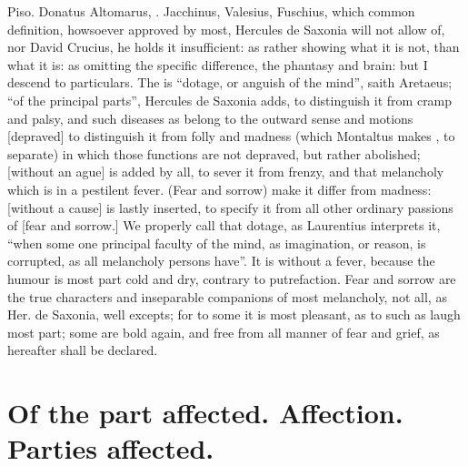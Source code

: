  Piso. 
Donatus Altomarus, . Jacchinus,
Valesius,  Fuschius,
 \etc{} which common
definition, howsoever approved by most, Hercules de
Saxonia will not allow of, nor David Crucius,  he holds it insufficient: as
rather showing what it is not, than what it is: as
omitting the specific difference, the phantasy and brain: but I descend to
particulars. The  is \enquote{dotage, or anguish of the mind}, saith
Aretaeus; \enquote{of the principal parts}, Hercules de Saxonia adds, to distinguish it
from cramp and palsy, and such diseases as belong to the outward sense and
motions [depraved] to distinguish it from folly and
madness (which Montaltus makes , to separate) in which those
functions are not depraved, but rather abolished; [without an ague] is added by
all, to sever it from frenzy, and that melancholy which is in a pestilent
fever. (Fear and sorrow) make it differ from madness: [without a cause] is
lastly inserted, to specify it from all other ordinary passions of [fear and
sorrow.] We properly call that dotage, as Laurentius
interprets it, \enquote{when some one principal faculty of the mind, as imagination, or
reason, is corrupted, as all melancholy persons have}. It is without a fever,
because the humour is most part cold and dry, contrary to putrefaction. Fear
and sorrow are the true characters and inseparable companions of most
melancholy, not all, as Her. de Saxonia,  well excepts; for to some it is most
pleasant, as to such as laugh most part; some are bold again, and free from all
manner of fear and grief, as hereafter shall be declared.

\section{Of the part affected. Affection. Parties affected.}\label{sec:parts-affected}

